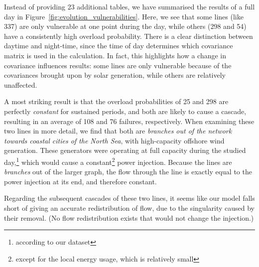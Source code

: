 \documentclass[main.tex]{subfiles}
\begin{document}
Instead of providing 23 additional tables, we have summarised the results of a full day in Figure~\ref{fig:evolution_vulnerabilities}. Here, we see that some lines (like 337) are only vulnerable at one point during the day, while others (298 and 54) have a consistently high overload probability. There is a clear distinction between daytime and night-time, since the time of day determines which covariance matrix is used in the calculation. In fact, this highlights how a change in covariance influences results: some lines are only vulnerable because of the covariances brought upon by solar generation, while others are relatively unaffected.

A most striking result is that the overload probabilities of 25 and 298 are perfectly \emph{constant} for sustained periods, and both are likely to cause a cascade, resulting in an average of 108 and 76 failures, respectively. When examining these two lines in more detail, we find that both are \emph{branches out of the network towards coastal cities of the North Sea}, with high-capacity offshore wind generation. These generators were operating at full capacity during the studied day,\footnote{according to our dataset} which would cause a constant\footnote{except for the local energy usage, which is relatively small} power injection. Because the lines are \emph{branches} out of the larger graph, the flow through the line is exactly equal to the power injection at its end, and therefore constant.

Regarding the subsequent cascades of these two lines, it seems like our model falls short of giving an accurate redistribution of flow, due to the singularity caused by their removal. (No flow redistribution exists that would not change the injection.) 
\end{document}
